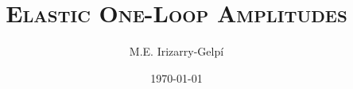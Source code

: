 \documentclass[legalpaper, 12pt]{report}
\begin{document}
\title{\Huge\textsc{Elastic One-Loop Amplitudes}}
\author{M.E. Irizarry-Gelp\'{i}}
\date{\today}

\maketitle
\tableofcontents





\end{document}
